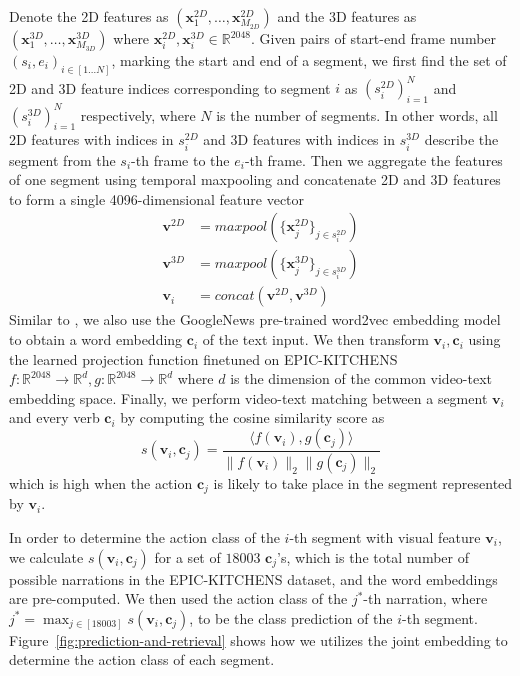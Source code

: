 Denote the 2D features as $(\mathbf{x}^{2D}_1,\dots,\mathbf{x}^{2D}_{M_{2D}})$ and the 3D features as $(\mathbf{x}^{3D}_1,\dots,\mathbf{x}^{3D}_{M_{3D}})$ where $\mathbf{x}^{2D}_i,\mathbf{x}^{3D}_i\in\mathbb{R}^{2048}$.
Given pairs of start-end frame number $(s_i,e_i)_{i \in [1\dots N]}$, marking the start and end of a segment, we first find the set of 2D and 3D feature indices corresponding to segment $i$ as $(s_i^{2D})_{i=1}^N$ and $(s_i^{3D})_{i=1}^N$ respectively, where $N$ is the number of segments. In other words, all 2D features with indices in $s_i^{2D}$ and 3D features with indices in $s_i^{3D}$ describe the segment from the $s_i$-th frame to the $e_i$-th frame. Then we aggregate the features of one segment using temporal maxpooling and concatenate 2D and 3D features to form a single 4096-dimensional feature vector
\begin{align*}
    \mathbf{v}^{2D}&=maxpool(\{\mathbf{x}_j^{2D}\}_{j\in s_i^{2D}})\\
    \mathbf{v}^{3D}&=maxpool(\{\mathbf{x}_j^{3D}\}_{j\in s_i^{3D}})\\
    \mathbf{v}_i&=concat(\mathbf{v}^{2D},\mathbf{v}^{3D})
\end{align*}
Similar to , we also use the GoogleNews pre-trained word2vec embedding model to obtain a word embedding $\mathbf{c}_i$ of the text input. 
We then transform $\mathbf{v}_i,\mathbf{c}_i$ using the learned projection function finetuned on EPIC-KITCHENS $f:\mathbb{R}^{2048}\to\mathbb{R}^d,g:\mathbb{R}^{2048}\to\mathbb{R}^d$ where $d$ is the dimension of the common video-text embedding space. Finally, we perform video-text matching between a segment $\mathbf{v}_i$ and every verb $\mathbf{c}_i$ by computing the cosine similarity score as
\[s(\mathbf{v}_i,\mathbf{c}_j)=\frac{\langle f(\mathbf{v}_i),g(\mathbf{c}_j)\rangle}{\|f(\mathbf{v}_i)\|_2\|g(\mathbf{c}_j)\|_2}\]
which is high when the action $\mathbf{c}_j$ is likely to take place in the segment represented by $\mathbf{v}_i$.

In order to determine the action class of the $i$-th segment with visual feature $\mathbf{v}_i$, we calculate $s(\mathbf{v}_i,\mathbf{c}_j)$ for a set of $18003$ $\mathbf{c}_j$'s, which is the total number of possible narrations in the EPIC-KITCHENS dataset, and the word embeddings are pre-computed. We then used the action class of the $j^{*}$-th narration, where 
$j^{*} = \max_{j \in [18003]} s(\mathbf{v}_i,\mathbf{c}_j)$, to be the class prediction of the $i$-th segment. Figure~\ref{fig:prediction-and-retrieval} shows how we utilizes the joint embedding to determine the action class of each segment.

